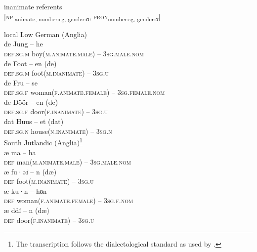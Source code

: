 \documentclass[output=paper]{langsci/langscibook}
\begin{document}
	\ex\label{ex:hoeder:12b}
	inanimate referents\\
       {[}\textsc{np}\textsc{\textsubscript{-}}\textsubscript{animate}\textsubscript{, number:sg, gender:}\textsubscript{α}, \textsc{pron}\textsubscript{number:sg, gender:}\textsubscript{α}{]}
       
    \z
\ex \label{ex:hoeder:13}
	local Low German (Anglia)\\
	\ea\label{ex:hoeder:13a}
	\gll de Jung – he\\
     \textsc{def.sg.m} boy(\textsc{m.animate.male}) – 3\textsc{sg.male.nom}\\

	\ex\label{ex:hoeder:13b}
	\gll de Foot – en (de)\\
     \textsc{def.sg.m}{} foot(\textsc{m.inanimate}) – 3\textsc{sg.u}\\

	\ex\label{ex:hoeder:13c}
	\gll de Fru – se\\
     \textsc{def.sg.f} woman(\textsc{f.animate.female}){} – 3\textsc{sg.female.nom}\\

	\ex\label{ex:hoeder:13d}
	\gll de Döör –{} en (de)\\
     \textsc{def.sg.f}{} door(\textsc{f.inanimate}) – 3\textsc{sg.u}\\

	\ex\label{ex:hoeder:13e}
	\gll dat Huus – et (dat)\\
     \textsc{def.sg.n} house(\textsc{n.inanimate}){} – 3\textsc{sg.n}\\
\z
\ex\label{ex:hoeder:14}
South Jutlandic (Anglia)\footnote{The transcription follows the dialectological standard as used by \citet{JulNielsen.1995}.}\\
	\ea\label{ex:hoeder:14a}	
	\gll æ ma\hoederN{} – ha\hoederN{}\\
     \textsc{def} man(\textsc{m.animate.male}){} – 3\textsc{sg.male.nom}\\

	\ex\label{ex:hoeder:14b}	
	\gll æ fu·əɹ̇ – n (dæ\hoederN{})\\
     \textsc{def}{} foot(\textsc{m.inanimate}) – 3\textsc{sg.u}\\

	\ex\label{ex:hoeder:14c}	
	\gll æ ku·n – hᴕn\\
     \textsc{def} woman(\textsc{f.animate.female}) – 3\textsc{sg.f.nom}\\

	\ex\label{ex:hoeder:14d}	
	\gll æ döɹ̇ – n (dæ\hoederN{})\\
     \textsc{def}{} door(\textsc{f.inanimate}) – 3\textsc{sg.u}\\
\end{document}
